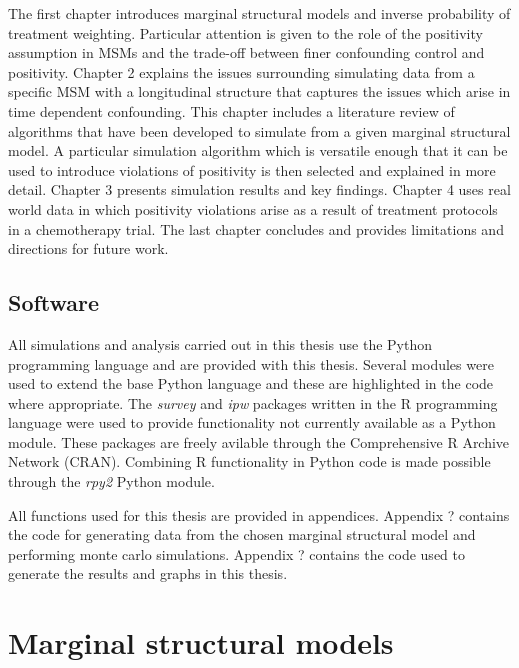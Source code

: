 \documentclass[11pt]{article}
\begin{document}
The first chapter introduces marginal structural models and inverse
probability of treatment weighting. Particular attention is given to the
role of the positivity assumption in MSMs and the trade-off between
finer confounding control and positivity. Chapter 2 explains the issues
surrounding simulating data from a specific MSM with a longitudinal
structure that captures the issues which arise in time dependent
confounding. This chapter includes a literature review of algorithms
that have been developed to simulate from a given marginal structural
model. A particular simulation algorithm which is versatile enough that
it can be used to introduce violations of positivity is then selected
and explained in more detail. Chapter 3 presents simulation results and
key findings. Chapter 4 uses real world data in which positivity
violations arise as a result of treatment protocols in a chemotherapy
trial. The last chapter concludes and provides limitations and
directions for future work.

    \subsection{Software}\label{software}

All simulations and analysis carried out in this thesis use the Python
programming language and are provided with this thesis. Several modules
were used to extend the base Python language and these are highlighted
in the code where appropriate. The \emph{survey} and \emph{ipw} packages
written in the R programming language were used to provide functionality
not currently available as a Python module. These packages are freely
avilable through the Comprehensive R Archive Network (CRAN). Combining R
functionality in Python code is made possible through the \emph{rpy2}
Python module. \linebreak

All functions used for this thesis are provided in appendices. Appendix
? contains the code for generating data from the chosen marginal
structural model and performing monte carlo simulations. Appendix ?
contains the code used to generate the results and graphs in this
thesis.

    \newpage

    \section{Marginal structural models}\label{marginal-structural-models}
\end{document}

